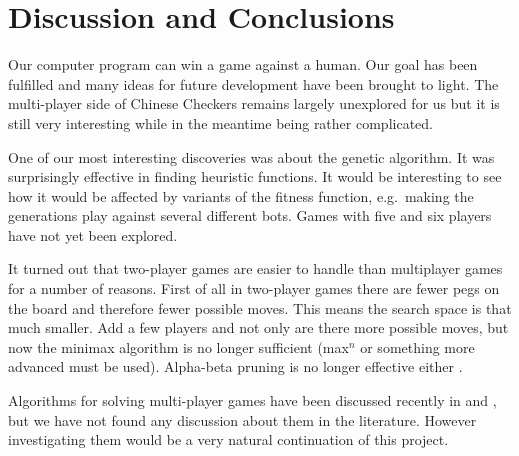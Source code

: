 \section{Discussion and Conclusions}

Our computer program can win a game against a human. Our goal has been
fulfilled and many ideas for future development have been brought to
light. The multi-player side of Chinese Checkers remains largely
unexplored for us but it is still very interesting while in the
meantime being rather complicated.

One of our most interesting discoveries was about the genetic
algorithm. It was surprisingly effective in finding heuristic
functions. It would be interesting to see how it would be affected by
variants of the fitness function, e.g.~making the generations play
against several different bots. Games with five and six players have
not yet been explored.

It turned out that two-player games are easier to handle than
multiplayer games for a number of reasons. First of all in two-player
games there are fewer pegs on the board and therefore fewer possible
moves. This means the search space is that much smaller. Add a few
players and not only are there more possible moves, but now the
minimax algorithm is no longer sufficient (max$^n$ or something more
advanced must be used). Alpha-beta pruning is no longer effective
either \cite{Korf199199}.

Algorithms for solving multi-player games have been discussed recently
in \cite{Hashavit} and \cite{bestreplysearch}, but we have not found
any discussion about them in the literature. However investigating
them would be a very natural continuation of this project.
